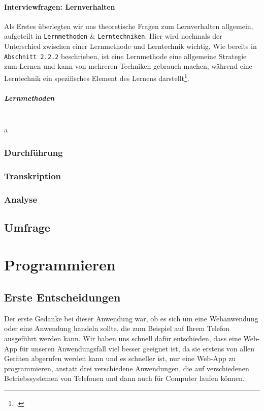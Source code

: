 \documentclass[12pt,a4paper]{report}
\newcommand{\myparagraph}[1]{\paragraph{#1}\mbox{}\\}
\begin{document}
\subsubsection {Interviewfragen: Lernverhalten}
Als Erstes überlegten wir uns theoretische Fragen zum Lernverhalten allgemein, aufgeteilt in \texttt{Lernmethoden} \& \texttt{Lerntechniken}. 
Hier wird nochmals der Unterschied zwischen einer Lernmethode und Lerntechnik wichtig. 
Wie bereits in \texttt{Abschnitt 2.2.2} beschrieben, ist eine Lernmethode eine allgemeine Strategie zum Lernen und kann von mehreren Techniken gebrauch machen, während eine Lerntechnik ein spezifisches Element des Lernens darstellt\footcite{Lerntechnik_1}.

\myparagraph{Lernmethoden}
a
\subsection {Durchführung}

\subsection {Transkription}

\subsection {Analyse}

\section{Umfrage}


\chapter{Programmieren}
\section{Erste Entscheidungen}
Der erste Gedanke bei dieser Anwendung war, ob es sich um eine Webanwendung oder eine Anwendung handeln sollte, die zum Beispiel auf Ihrem Telefon ausgeführt werden kann. Wir haben uns schnell dafür entschieden, dass eine Web-App für unseren Anwendungsfall viel besser geeignet ist, da sie erstens von allen Geräten abgerufen werden kann und es schneller ist, nur eine Web-App zu programmieren, anstatt drei verschiedene Anwendungen, die auf verschiedenen Betriebssystemen von Telefonen und dann auch für Computer laufen können.
\end{document}
